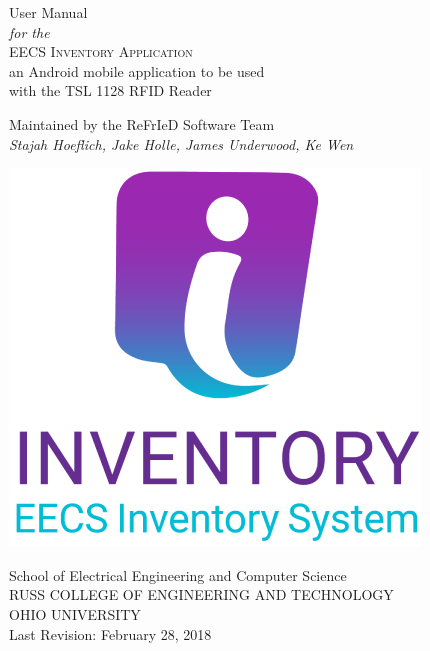 \newpage
\begin{center}
\thispagestyle{empty}

\vspace*{\fill}

\Large{
   User Manual
      \\[0.5cm]
\large\textit{
   for the}
      \\[0.5cm]
\LARGE{
\textsc {
   EECS Inventory Application}}\\
\large{
   an Android mobile application to be used\\
   with the TSL 1128 RFID Reader}\\[0.5cm]}

\vspace{1cm}

\large{Maintained by the ReFrIeD Software Team}
\\
\textit{Stajah Hoeflich, Jake Holle, James Underwood, Ke Wen}

\vspace*{\fill}

\includegraphics[width=.25\textwidth]{manual/images/logo.png}

\vspace{1cm}
\large{School of Electrical Engineering and Computer Science}\\
\large{RUSS COLLEGE OF ENGINEERING AND TECHNOLOGY}\\
\large{OHIO UNIVERSITY}
\large{\\[0.5cm]Last Revision: February 28, 2018}\\
\newpage
\end{center}
